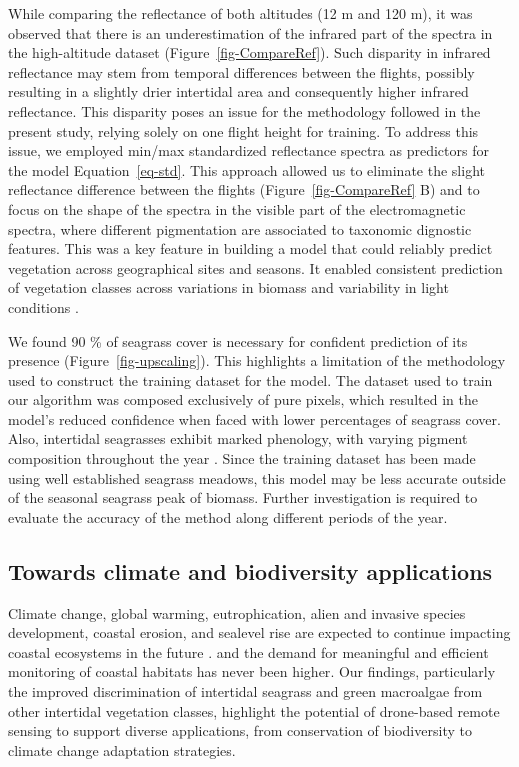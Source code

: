 \documentclass[
  number]{elsarticle}
\begin{document}
While comparing the reflectance of both altitudes (12 m and 120 m), it
was observed that there is an underestimation of the infrared part of
the spectra in the high-altitude dataset (Figure~\ref{fig-CompareRef}).
Such disparity in infrared reflectance may stem from temporal
differences between the flights, possibly resulting in a slightly drier
intertidal area and consequently higher infrared reflectance. This
disparity poses an issue for the methodology followed in the present
study, relying solely on one flight height for training. To address this
issue, we employed min/max standardized reflectance spectra as
predictors for the model Equation~\ref{eq-std}. This approach allowed us
to eliminate the slight reflectance difference between the flights
(Figure~\ref{fig-CompareRef} B) and to focus on the shape of the spectra
in the visible part of the electromagnetic spectra, where different
pigmentation are associated to taxonomic dignostic features. This was a
key feature in building a model that could reliably predict vegetation
across geographical sites and seasons. It enabled consistent prediction
of vegetation classes across variations in biomass and variability in
light conditions \citetext{\citealp[ ]{fyfe2003spatial}; \citealp[
]{COSTA2021107018}; \citealp{piaser2023impact}}.

We found 90 \% of seagrass cover is necessary for confident prediction
of its presence (Figure~\ref{fig-upscaling}). This highlights a
limitation of the methodology used to construct the training dataset for
the model. The dataset used to train our algorithm was composed
exclusively of pure pixels, which resulted in the model's reduced
confidence when faced with lower percentages of seagrass cover. Also,
intertidal seagrasses exhibit marked phenology, with varying pigment
composition throughout the year \citetext{\citealp[
]{bargain2013seasonal}; \citealp{legare2022remote}}. Since the training
dataset has been made using well established seagrass meadows, this
model may be less accurate outside of the seasonal seagrass peak of
biomass. Further investigation is required to evaluate the accuracy of
the method along different periods of the year.

\subsection{Towards climate and biodiversity
applications}\label{towards-climate-and-biodiversity-applications}

Climate change, global warming, eutrophication, alien and invasive
species development, coastal erosion, and sealevel rise are expected to
continue impacting coastal ecosystems in the future
\citetext{\citealp{SCHIBALSKI2022101414}; \citealp[
]{holon2018predictive}; \citealp{marquet2024global}}. and the demand for
meaningful and efficient monitoring of coastal habitats has never been
higher\citetext{\citealp[ ]{muller2018satellite}; \citealp[
]{villalobos2023remote}; \citealp{oiry2021using}}. Our findings,
particularly the improved discrimination of intertidal seagrass and
green macroalgae from other intertidal vegetation classes, highlight the
potential of drone-based remote sensing to support diverse applications,
from conservation of biodiversity to climate change adaptation
strategies.
\end{document}

